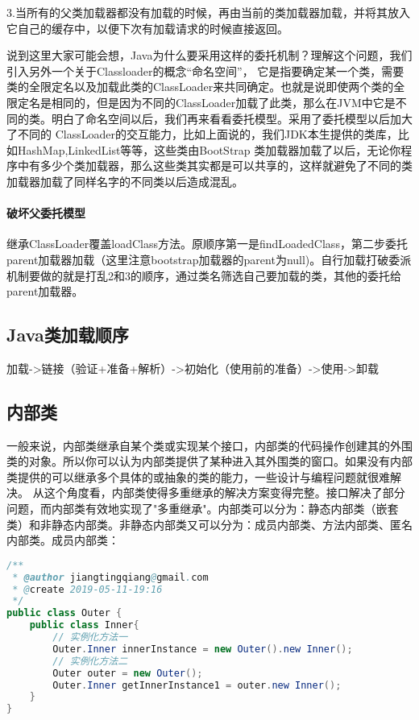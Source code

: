 \documentclass[../../../interview-questions.tex]{subfiles}
\begin{document}
3.当所有的父类加载器都没有加载的时候，再由当前的类加载器加载，并将其放入它自己的缓存中，以便下次有加载请求的时候直接返回。

说到这里大家可能会想，Java为什么要采用这样的委托机制？理解这个问题，我们引入另外一个关于Classloader的概念“命名空间”， 它是指要确定某一个类，需要类的全限定名以及加载此类的ClassLoader来共同确定。也就是说即使两个类的全限定名是相同的，但是因为不同的ClassLoader加载了此类，那么在JVM中它是不同的类。明白了命名空间以后，我们再来看看委托模型。采用了委托模型以后加大了不同的 ClassLoader的交互能力，比如上面说的，我们JDK本生提供的类库，比如HashMap,LinkedList等等，这些类由BootStrap 类加载器加载了以后，无论你程序中有多少个类加载器，那么这些类其实都是可以共享的，这样就避免了不同的类加载器加载了同样名字的不同类以后造成混乱。


\paragraph{破坏父委托模型}

继承ClassLoader覆盖loadClass方法。原顺序第一是findLoadedClass，第二步委托parent加载器加载（这里注意bootstrap加载器的parent为null)。自行加载打破委派机制要做的就是打乱2和3的顺序，通过类名筛选自己要加载的类，其他的委托给parent加载器。

\subsection{Java类加载顺序}

加载->链接（验证+准备+解析）->初始化（使用前的准备）->使用->卸载


\subsection{内部类}

一般来说，内部类继承自某个类或实现某个接口，内部类的代码操作创建其的外围类的对象。所以你可以认为内部类提供了某种进入其外围类的窗口。如果没有内部类提供的可以继承多个具体的或抽象的类的能力，一些设计与编程问题就很难解决。 从这个角度看，内部类使得多重继承的解决方案变得完整。接口解决了部分问题，而内部类有效地实现了"多重继承"。内部类可以分为：静态内部类（嵌套类）和非静态内部类。非静态内部类又可以分为：成员内部类、方法内部类、匿名内部类。成员内部类：

\begin{lstlisting}[language=Java]
/**
 * @author jiangtingqiang@gmail.com
 * @create 2019-05-11-19:16
 */
public class Outer {
    public class Inner{
        // 实例化方法一
        Outer.Inner innerInstance = new Outer().new Inner();
        // 实例化方法二
        Outer outer = new Outer();
        Outer.Inner getInnerInstance1 = outer.new Inner();
    }
}
\end{lstlisting}
\end{document}
